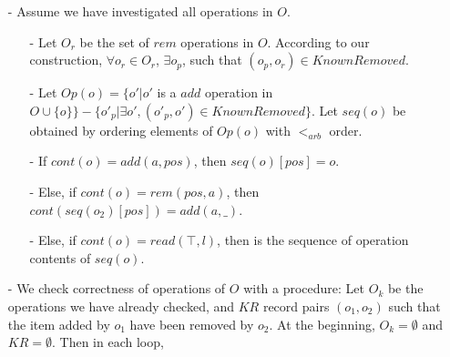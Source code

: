 {\begin{itemize}
\begin{itemize}
    \item[-] Let $Op(o_2) = \{ o' \vert o'$ is a $add$ operation in $<^{-1}(o_2) \cup \{ o_2 \} \} - \{ o'_p \vert \exists o', (o'_p,o') \in KnownRemoved \}$. Let $seq(o_2)$ be obtained by ordering elements of $Op(o_2)$ with $<_{\mathit{arb}}$ order.

    \item[-] If $cont(o_2) = add(a,pos)$, then $seq(o_2)[pos] = o_2$.

    \item[-] Else, if $cont(o_2) = rem(pos,a)$, then $cont(seq(o_2)[pos])=add(a,\_)$. Let $o_a=seq(o_2)[pos]$. Let $KnownRemoved = KnownRemoved \cup \{ (o_a,o_2) \}$.
    \end{itemize}

\item[-] Assume we have investigated all operations in $O$.

    \begin{itemize}
    \setlength{\itemsep}{0.5pt}
    \item[-] Let $O_r$ be the set of $rem$ operations in $O$. According to our construction, $\forall o_r \in O_r$, $\exists o_p$, such that $(o_p,o_r) \in KnownRemoved$.

    \item[-] Let $Op(o) = \{ o' \vert o'$ is a $add$ operation in $O \cup \{ o \} \} - \{ o'_p \vert \exists o', (o'_p,o') \in KnownRemoved \}$. Let $seq(o)$ be obtained by ordering elements of $Op(o)$ with $<_{\mathit{arb}}$ order.

    \item[-] If $cont(o) = add(a,pos)$, then $seq(o)[pos] = o$.

    \item[-] Else, if $cont(o) = rem(pos,a)$, then $cont(seq(o_2)[pos])=add(a,\_)$.

    \item[-] Else, if $cont(o)=read(\top,l)$, then is the sequence of operation contents of $seq(o)$.
    \end{itemize}
\end{itemize}


\begin{itemize}
\item[-] We check correctness of operations of $O$ with a procedure: Let $O_k$ be the operations we have already checked, and $KR$ record pairs $(o_1,o_2)$ such that the item added by $o_1$ have been removed by $o_2$. At the beginning, $O_k = \emptyset$ and $KR = \emptyset$. Then in each loop,


\end{itemize}}
